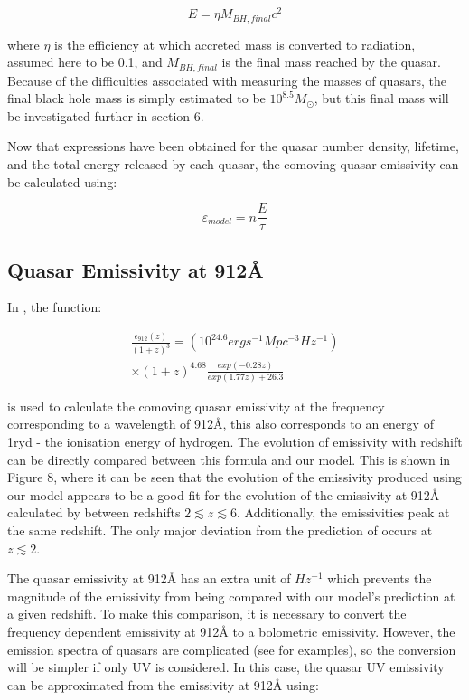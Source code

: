 \documentclass[12pt]{article}%
\begin{document}
\begin{equation}
    E=\eta M_{BH,final}c^2
\end{equation}

\noindent where $\eta$ is the efficiency at which accreted mass is converted to radiation, assumed here to be 0.1, and $M_{BH,final}$ is the final mass reached by the quasar. Because of the difficulties associated with measuring the masses of quasars, the final black hole mass is simply estimated to be $10^{8.5}M_\odot$, but this final mass will be investigated further in section 6.\par

Now that expressions have been obtained for the quasar number density, lifetime, and the total energy released by each quasar, the comoving quasar emissivity can be calculated using:

\begin{equation}
    \varepsilon_{model}=n\frac{E}{\tau}
\end{equation}

\subsection{Quasar Emissivity at 912\AA}

In \cite{Haardt_Madau}, the function:

\begin{multline}
    \frac{\epsilon_{912}(z)}{(1+z)^3}=(10^{24.6}erg s^{-1}Mpc^{-3}Hz^{-1})\\
    \times(1+z)^{4.68}\frac{exp(-0.28z)}{exp(1.77z)+26.3}
\end{multline}

\noindent is used to calculate the comoving quasar emissivity at the frequency corresponding to a wavelength of 912\AA, this also corresponds to an energy of 1ryd - the ionisation energy of hydrogen. The evolution of emissivity with redshift can be directly compared between this formula and our model. This is shown in Figure 8, where it can be seen that the evolution of the emissivity produced using our model appears to be a good fit for the evolution of the emissivity at 912\AA \: calculated by \cite{Haardt_Madau} between redshifts $2\lesssim z\lesssim6$. Additionally, the emissivities peak at the same redshift. The only major deviation from the prediction of \citeauthor{Haardt_Madau} occurs at $z\lesssim2$.\par

The quasar emissivity at 912\AA \: has an extra unit of $Hz^{-1}$ which prevents the magnitude of the emissivity from being compared with our model's prediction at a given redshift. To make this comparison, it is necessary to convert the frequency dependent emissivity at 912\AA \: to a bolometric emissivity. However, the emission spectra of quasars are complicated (see \cite{QSO_Spectrum} for examples), so the conversion will be simpler if only UV is considered. In this case, the quasar UV emissivity can be approximated from the emissivity at 912\AA \: using:
\end{document}
